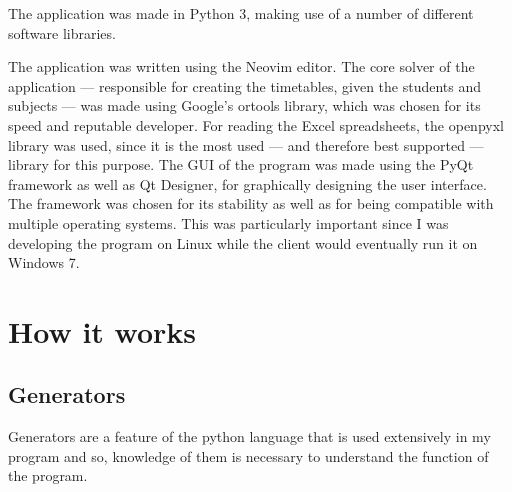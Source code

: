 \documentclass[12pt]{article}
\begin{document}
The application was made in Python 3, making use of a number of different software
libraries.  

The application was written using the Neovim \autocite{neovim} editor. The core solver of
the application --- responsible for creating the timetables, given the students and subjects
--- was made using Google's ortools \autocite{ortools} library, which was chosen for its
speed and reputable developer.  For reading the Excel spreadsheets, the
openpyxl\autocite{openpyxl} library was used, since it is the most used --- and therefore
best supported --- library for this purpose. The GUI of the program was made using the PyQt
\autocite{pyqt} framework as well as Qt Designer\autocite{qtdesigner}, for graphically
designing the user interface. The framework was chosen for its stability as well as for
being compatible with multiple operating systems. This was particularly important since I
was developing the program on Linux while the client would eventually run it on Windows 7.


\section{How it works}

\subsection{Generators}

Generators are a feature of the python language that is used extensively in my program and
so, knowledge of them is necessary to understand the function of the program. 
\end{document}
